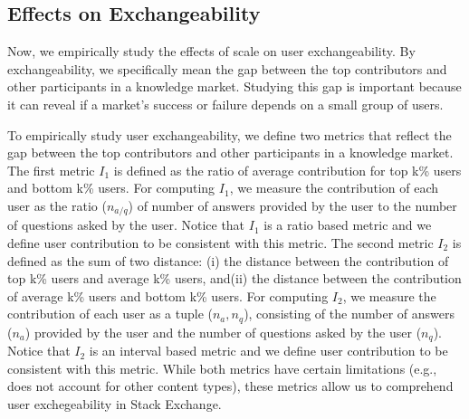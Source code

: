 \subsection{Effects on Exchangeability}
Now, we empirically study the effects of scale on user exchangeability. By exchangeability, we specifically mean the gap between the top contributors and other participants in a knowledge market. Studying this gap is important because it can reveal if a market's success or failure depends on a small group of users.  

To empirically study user exchangeability, we define two metrics that reflect the gap between the top contributors and other participants in a knowledge market. The first metric $I_1$ is defined as the ratio of average contribution for top k\% users and bottom k\% users. For computing $I_1$, we measure the contribution of each user as the ratio ($n_{a/q}$) of number of answers provided by the user to the number of questions asked by the user. Notice that $I_1$ is a ratio based metric and we define user contribution to be consistent with this metric. The second metric $I_2$ is defined as the sum of two distance: (i) the distance between the contribution of top k\% users and average k\% users, and(ii) the distance between the contribution of average k\% users and bottom k\% users. For computing $I_2$, we measure the contribution of each user as a tuple ($n_a, n_q$), consisting of the number of answers ($n_a$) provided by the user and the number of questions asked by the user ($n_q$). Notice that $I_2$ is an interval based metric and we define user contribution to be consistent with this metric. While both metrics have certain limitations (e.g., does not account for other content types), these metrics allow us to comprehend user exchegeability in Stack Exchange.

